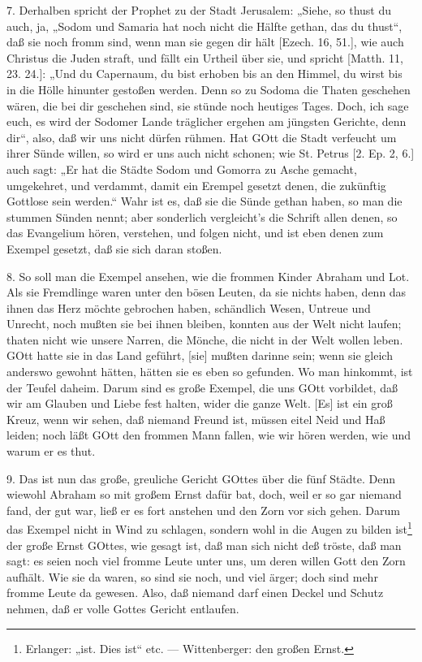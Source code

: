 7. Derhalben spricht der Prophet zu der Stadt Jerusalem: „Siehe, so thust du auch, ja, „Sodom und Samaria hat noch nicht die Hälfte gethan, das du thust“, daß sie noch fromm sind, wenn man sie gegen dir hält [Ezech. 16, 51.], wie auch Christus die Juden straft, und fällt ein Urtheil über sie, und spricht [Matth. 11, 23. 24.]: „Und du Capernaum, du bist erhoben bis an den Himmel, du wirst bis in die Hölle hinunter gestoßen werden. Denn so zu Sodoma die Thaten geschehen wären, die bei dir geschehen sind, sie stünde noch heutiges Tages. Doch, ich sage euch, es wird der Sodomer Lande träglicher ergehen am jüngsten Gerichte, denn dir“, also, daß wir uns nicht dürfen rühmen. Hat GOtt die Stadt verfeucht um ihrer Sünde willen, so wird er uns auch nicht schonen; wie St. Petrus [2. Ep. 2, 6.] auch sagt: „Er hat die Städte Sodom und Gomorra zu Asche gemacht, umgekehret, und verdammt, damit ein Erempel gesetzt
denen, die zukünftig Gottlose sein werden.“ Wahr ist es, daß sie die Sünde gethan haben, so man die stummen Sünden nennt; aber sonderlich vergleicht’s die Schrift allen denen, so das Evangelium hören, verstehen, und folgen nicht, und ist eben denen zum Exempel gesetzt, daß sie sich daran stoßen.

8. So soll man die Exempel ansehen, wie die frommen Kinder Abraham und Lot. Als sie Fremdlinge waren unter den bösen Leuten, da sie nichts haben, denn das ihnen das Herz möchte gebrochen haben, schändlich Wesen, Untreue und Unrecht, noch mußten sie bei ihnen bleiben, konnten aus der Welt nicht laufen; thaten nicht wie unsere Narren, die Mönche, die nicht in der Welt wollen leben. GOtt hatte sie in das Land geführt, [sie] mußten darinne sein; wenn sie gleich anderswo gewohnt hätten, hätten sie es eben so gefunden. Wo man hinkommt, ist der Teufel daheim. Darum sind es große Exempel, die uns GOtt vorbildet, daß wir am Glauben und Liebe fest halten, wider die ganze Welt. [Es] ist ein groß Kreuz, wenn wir sehen, daß niemand Freund ist, müssen eitel Neid und Haß leiden; noch läßt GOtt den frommen Mann fallen, wie wir hören werden, wie und warum er es thut.

9. Das ist nun das große, greuliche Gericht GOttes über die fünf Städte. Denn wiewohl Abraham so mit großem Ernst dafür bat, doch, weil er so gar niemand fand, der gut war, ließ er es fort anstehen und den Zorn vor sich gehen. Darum das Exempel nicht in Wind zu schlagen, sondern wohl in die Augen zu bilden ist\footnote{Erlanger: „ist. Dies ist“ etc. — Wittenberger: den großen Ernst.} der große Ernst GOttes, wie gesagt ist, daß man sich nicht deß tröste, daß man sagt: es seien noch viel fromme Leute unter uns, um deren willen Gott den Zorn aufhält. Wie sie da waren, so sind sie noch, und viel ärger; doch sind mehr fromme Leute da gewesen. Also, daß niemand darf einen Deckel und Schutz nehmen, daß er volle Gottes Gericht entlaufen.

